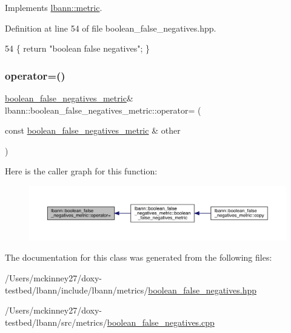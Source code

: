 Implements \hyperlink{classlbann_1_1metric_af455d7b6874d3491bc04f0f2ebfcab51}{lbann\+::metric}.



Definition at line 54 of file boolean\+\_\+false\+\_\+negatives.\+hpp.


\begin{DoxyCode}
54 \{ \textcolor{keywordflow}{return} \textcolor{stringliteral}{"boolean false negatives"}; \}
\end{DoxyCode}
\mbox{\label{classlbann_1_1boolean__false__negatives__metric_a3182852b817e1e4edc5593220ab84e58}} 
\subsubsection{\texorpdfstring{operator=()}{operator=()}}
{\footnotesize\ttfamily \hyperlink{classlbann_1_1boolean__false__negatives__metric}{boolean\+\_\+false\+\_\+negatives\+\_\+metric}\& lbann\+::boolean\+\_\+false\+\_\+negatives\+\_\+metric\+::operator= (\begin{DoxyParamCaption}\item[{const \hyperlink{classlbann_1_1boolean__false__negatives__metric}{boolean\+\_\+false\+\_\+negatives\+\_\+metric} \&}]{other }\end{DoxyParamCaption})\hspace{0.3cm}{\ttfamily [default]}}

Here is the caller graph for this function\+:\nopagebreak
\begin{figure}[H]
\begin{center}
\leavevmode
\includegraphics[width=350pt]{classlbann_1_1boolean__false__negatives__metric_a3182852b817e1e4edc5593220ab84e58_icgraph}
\end{center}
\end{figure}


The documentation for this class was generated from the following files\+:\begin{DoxyCompactItemize}
\item 
/\+Users/mckinney27/doxy-\/testbed/lbann/include/lbann/metrics/\hyperlink{boolean__false__negatives_8hpp}{boolean\+\_\+false\+\_\+negatives.\+hpp}\item 
/\+Users/mckinney27/doxy-\/testbed/lbann/src/metrics/\hyperlink{boolean__false__negatives_8cpp}{boolean\+\_\+false\+\_\+negatives.\+cpp}\end{DoxyCompactItemize}
